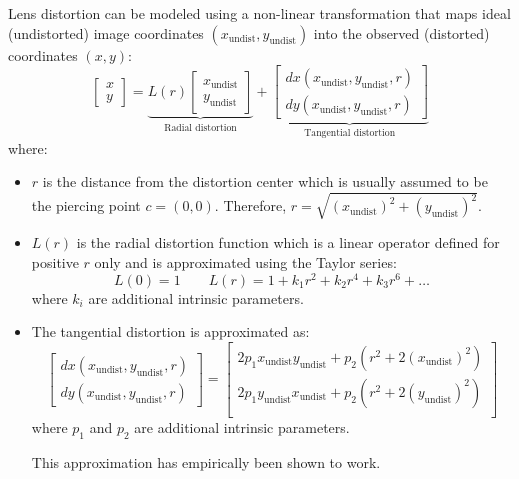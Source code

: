 Lens distortion can be modeled using a non-linear transformation that maps ideal (undistorted) image coordinates $(x_\text{undist}, y_\text{undist})$ into
the observed (distorted) coordinates $(x, y)$:
\[ 
    \begin{bmatrix} x \\ y \end{bmatrix} =
    \underbrace{ L(r) \begin{bmatrix} x_\text{undist} \\ y_\text{undist} \end{bmatrix} }_{\text{Radial distortion}} +
    \underbrace{ \begin{bmatrix} dx(x_\text{undist}, y_\text{undist}, r) \\ dy(x_\text{undist}, y_\text{undist}, r) \end{bmatrix} }_{\text{Tangential distortion}}
\]
where:
\begin{itemize}
    \item $r$ is the distance from the distortion center which is usually assumed to be the piercing point $c = (0, 0)$.
        Therefore, $r = \sqrt{ (x_\text{undist})^2 + (y_\text{undist})^2 }$.
    \item $L(r)$ is the radial distortion function which is a linear operator defined for positive $r$ only and is approximated using the Taylor series:
        \[ L(0) = 1 \hspace{2em} L(r) = 1 + k_1 r^2 + k_2 r^4 + k_3 r^6 + \dots \]
        where $k_i$ are additional intrinsic parameters.
    \item The tangential distortion is approximated as:
        \[ 
            \begin{bmatrix} dx(x_\text{undist}, y_\text{undist}, r) \\ dy(x_\text{undist}, y_\text{undist}, r) \end{bmatrix} =
            \begin{bmatrix} 
                2 p_1 x_\text{undist} y_\text{undist} + p_2 (r^2 + 2(x_\text{undist})^2) \\
                2 p_1 y_\text{undist} x_\text{undist} + p_2 (r^2 + 2(y_\text{undist})^2) \\
            \end{bmatrix}
        \]
        where $p_1$ and $p_2$ are additional intrinsic parameters.
        \begin{remark}
            This approximation has empirically been shown to work.
        \end{remark}
\end{itemize}

